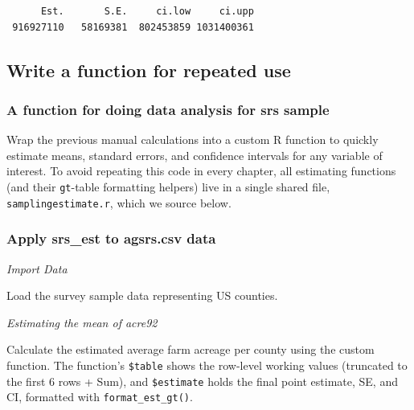\documentclass[
  letterpaper,
  DIV=11,
  numbers=noendperiod]{scrreprt}
\renewcommand{\[}{\begin{equation}}
\renewcommand{\]}{\end{equation}}
\begin{document}
\begin{verbatim}
      Est.       S.E.     ci.low     ci.upp 
 916927110   58169381  802453859 1031400361 
\end{verbatim}

\subsection{Write a function for repeated
use}\label{write-a-function-for-repeated-use}

\subsubsection{A function for doing data analysis for srs
sample}\label{a-function-for-doing-data-analysis-for-srs-sample}

Wrap the previous manual calculations into a custom R function to
quickly estimate means, standard errors, and confidence intervals for
any variable of interest. To avoid repeating this code in every chapter,
all estimating functions (and their \texttt{gt}-table formatting
helpers) live in a single shared file, \texttt{samplingestimate.r},
which we source below.

\subsubsection{Apply srs\_est to agsrs.csv
data}\label{apply-srs_est-to-agsrs.csv-data}

\emph{Import Data}

Load the survey sample data representing US counties.

\emph{Estimating the mean of acre92}

Calculate the estimated average farm acreage per county using the custom
function. The function's \texttt{\$table} shows the row-level working
values (truncated to the first 6 rows + Sum), and \texttt{\$estimate}
holds the final point estimate, SE, and CI, formatted with
\texttt{format\_est\_gt()}.
\end{document}
